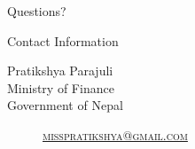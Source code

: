 \documentclass[
 size=14pt,
 paper=smartboard,  %
 mode=present, 		%
 display=slides, 	%
 style=tuliplab,  	%
 pauseslide,
 fleqn,leqno]{powerdot}
\begin{document}
%
\begin{slide}[toc=,bm=]{Questions?}
\begin{center}
\begin{figure}
\end{figure}
\end{center}
\end{slide}


\begin{wideslide}[toc=,bm=]{Contact Information}
\centering
{}
\twocolumn[
lcolwidth=0.35\linewidth,
rcolwidth=0.65\linewidth
]
{
}
{
Pratikshya Parajuli\\
Ministry of Finance\\
Government of Nepal
\begin{description}
 \item[\textcolor{orange}{\faEnvelope}] \href{mailto:misspratikshya@gmail.com}
 {\textsc{\footnotesize{misspratikshya@gmail.com}}}
\end{description}
}
\end{wideslide}
\end{document}
